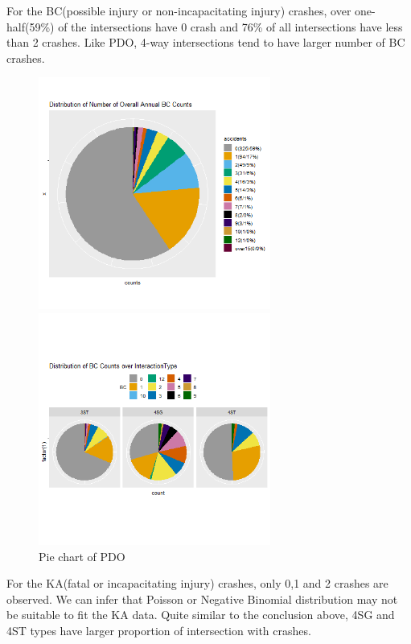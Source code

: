 \documentclass[11pt]{scrartcl} %
\begin{document}
For the BC(possible injury or non-incapacitating injury) crashes, over one-half(59\%) of the intersections have 0 crash and 76\% of all intersections have less than 2 crashes. Like PDO, 4-way intersections tend to have larger number of BC crashes.

\begin{figure}[H]
\begin{minipage}[t]{0.5\linewidth}
\centering
\includegraphics[width=3in]{image/p113.png}
\small
\end{minipage}
\begin{minipage}[t]{0.5\linewidth}
\centering
\includegraphics[width=3in]{image/p121_BC.png}
\small
\end{minipage}
\caption{Pie chart of PDO}
\end{figure}

For the KA(fatal or incapacitating injury) crashes, only 0,1 and 2 crashes are observed. We can infer that Poisson or Negative Binomial distribution may not be suitable to fit the KA data. Quite similar to the conclusion above, 4SG and 4ST types have larger proportion of intersection with crashes.
\end{document}

